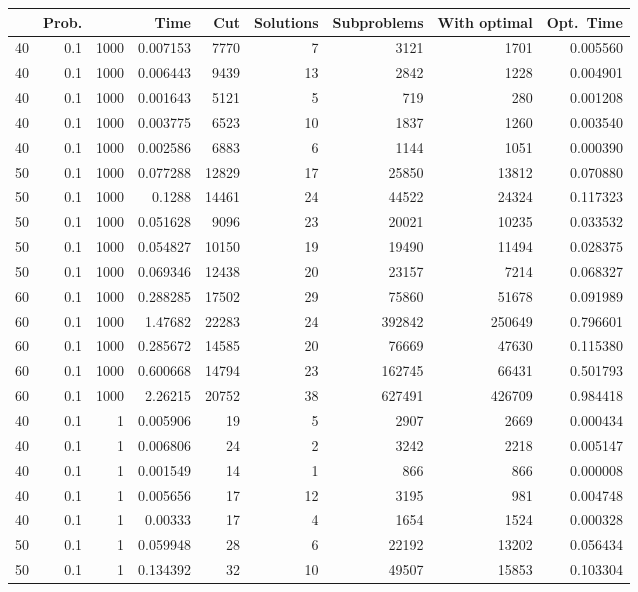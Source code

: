 \documentclass[a4paper,11pt]{article}
\begin{document}
\begin{table}
\begin{center}
\begin{tabular}{|rrr|r|r|rrr|r|}
\hline
 & Prob. &  & Time & Cut & Solutions & Subproblems & With
optimal & Opt.\ Time \\
\hline
40 & 0.1 & 1000 & 0.007153 & 7770 & 7 & 3121 & 1701 & 0.005560 \\
40 & 0.1 & 1000 & 0.006443 & 9439 & 13 & 2842 & 1228 & 0.004901 \\
40 & 0.1 & 1000 & 0.001643 & 5121 & 5 & 719 & 280 & 0.001208 \\
40 & 0.1 & 1000 & 0.003775 & 6523 & 10 & 1837 & 1260 & 0.003540 \\
40 & 0.1 & 1000 & 0.002586 & 6883 & 6 & 1144 & 1051 & 0.000390 \\
50 & 0.1 & 1000 & 0.077288 & 12829 & 17 & 25850 & 13812 & 0.070880 \\
50 & 0.1 & 1000 & 0.1288 & 14461 & 24 & 44522 & 24324 & 0.117323 \\
50 & 0.1 & 1000 & 0.051628 & 9096 & 23 & 20021 & 10235 & 0.033532 \\
50 & 0.1 & 1000 & 0.054827 & 10150 & 19 & 19490 & 11494 & 0.028375 \\
50 & 0.1 & 1000 & 0.069346 & 12438 & 20 & 23157 & 7214 & 0.068327 \\
60 & 0.1 & 1000 & 0.288285 & 17502 & 29 & 75860 & 51678 & 0.091989 \\
60 & 0.1 & 1000 & 1.47682 & 22283 & 24 & 392842 & 250649 & 0.796601 \\
60 & 0.1 & 1000 & 0.285672 & 14585 & 20 & 76669 & 47630 & 0.115380 \\
60 & 0.1 & 1000 & 0.600668 & 14794 & 23 & 162745 & 66431 & 0.501793 \\
60 & 0.1 & 1000 & 2.26215 & 20752 & 38 & 627491 & 426709 & 0.984418 \\
\hline
40 & 0.1 & 1 & 0.005906 & 19 & 5 & 2907 & 2669 & 0.000434 \\
40 & 0.1 & 1 & 0.006806 & 24 & 2 & 3242 & 2218 & 0.005147 \\
40 & 0.1 & 1 & 0.001549 & 14 & 1 & 866 & 866 & 0.000008 \\
40 & 0.1 & 1 & 0.005656 & 17 & 12 & 3195 & 981 & 0.004748 \\
40 & 0.1 & 1 & 0.00333 & 17 & 4 & 1654 & 1524 & 0.000328 \\
50 & 0.1 & 1 & 0.059948 & 28 & 6 & 22192 & 13202 & 0.056434 \\
50 & 0.1 & 1 & 0.134392 & 32 & 10 & 49507 & 15853 & 0.103304 \\

\end{tabular}
\end{center}
\end{table}
\end{document}
